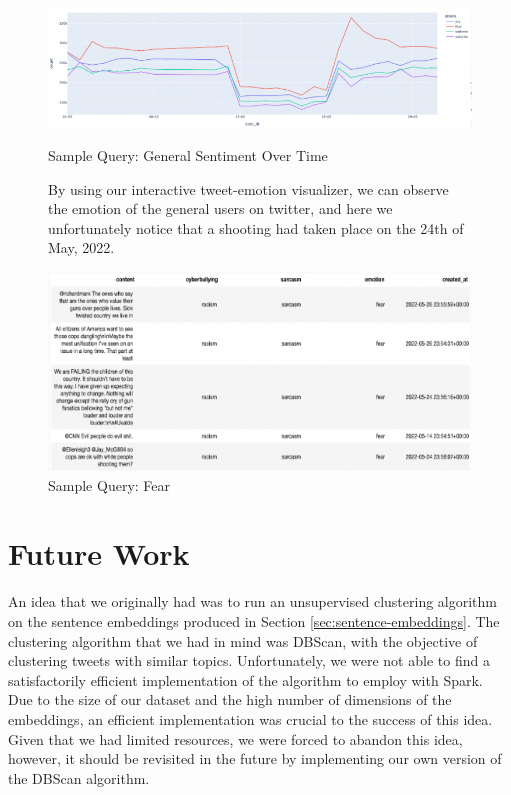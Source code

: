 \documentclass[a4paper,12pt]{article}
\begin{document}
\begin{figure}[h]
{\centering
	\includegraphics[width=\textwidth]{graph.png}
	\caption{Sample Query: General Sentiment Over Time}
	\label{fig:Emotion-Time-Query}
}
	\vspace{5mm} %
By using our interactive tweet-emotion visualizer, we can
observe the emotion of the general users on twitter, and here we unfortunately notice that a shooting had taken place
on the 24th of May, 2022.
	{
	\centering
	\includegraphics[width=\textwidth]{graphTweets.png}
	\caption{Sample Query: Fear}
	\label{fig:Fear-Query}
}
\end{figure}

\section{Future Work}
An idea that we originally had was to run an unsupervised clustering algorithm on the sentence embeddings produced in Section \ref{sec:sentence-embeddings}. The clustering algorithm that we had in mind was DBScan\cite{Ester96adensity-based}, with the objective of clustering tweets with similar topics. Unfortunately, we were not able to find a satisfactorily efficient implementation of the algorithm to employ with Spark. Due to the size of our dataset and the high number of dimensions of the embeddings, an efficient implementation was crucial to the success of this idea. Given that we had limited resources, we were forced to abandon this idea, however, it should be revisited in the future by implementing our own version of the DBScan algorithm.
\end{document}
